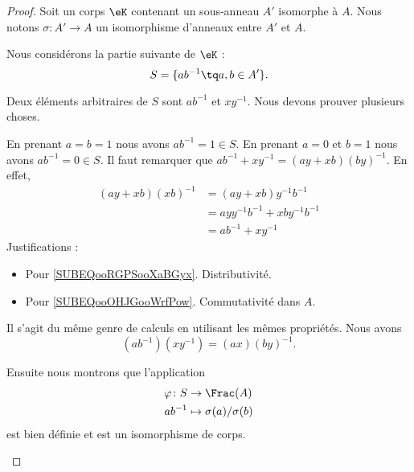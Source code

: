 \begin{proof}
	Soit un corps \( \eK\) contenant un sous-anneau \( A'\) isomorphe à \( A\). Nous notons \( \sigma\colon A'\to A\) un isomorphisme d'anneaux entre \( A'\) et \( A\).

	\begin{subproof}

		Nous considérons la partie suivante de \( \eK\) :
		\begin{equation}
			S=\{ ab^{-1}\tq a,b\in A' \}.
		\end{equation}

		Deux éléments arbitraires de \( S\) sont \( ab^{-1}\) et \( xy^{-1}\). Nous devons prouver plusieurs choses.
		\begin{subproof}
			\spitem[Neutres]
			En prenant \( a=b=1\) nous avons \( ab^{-1}=1\in S\). En prenant \( a=0\) et \( b=1\) nous avons \( ab^{-1}=0\in S\).
			\spitem[Somme]
			Il faut remarquer que \( ab^{-1}+xy^{-1}=(ay+xb)(by)^{-1}\). En effet,
			\begin{subequations}
				\begin{align}
					(ay+xb)(xb)^{-1} & =(ay+xb)y^{-1}b^{-1}                                           \\
					                 & =ayy^{-1}b^{-1}+xby^{-1}b^{-1}     \label{SUBEQooRGPSooXaBGyx} \\
					                 & =ab^{-1}+xy^{-1}       \label{SUBEQooOHJGooWrfPow}
				\end{align}
			\end{subequations}
			Justifications :
			\begin{itemize}
				\item Pour \eqref{SUBEQooRGPSooXaBGyx}. Distributivité.
				\item Pour \eqref{SUBEQooOHJGooWrfPow}. Commutativité dans \( A\).
			\end{itemize}
			\spitem[Produit]
			Il s'agit du même genre de calculs en utilisant les mêmes propriétés. Nous avons
			\begin{equation}
				(ab^{-1})(xy^{-1})=(ax)(by)^{-1}.
			\end{equation}
		\end{subproof}



		Ensuite nous montrons que l'application
		\begin{equation}
			\begin{aligned}
				\varphi\colon S & \to \Frac(A)                \\
				ab^{-1}         & \mapsto \sigma(a)/\sigma(b)
			\end{aligned}
		\end{equation}
		est bien définie et est un isomorphisme de corps.


\end{subproof}
\end{proof}
